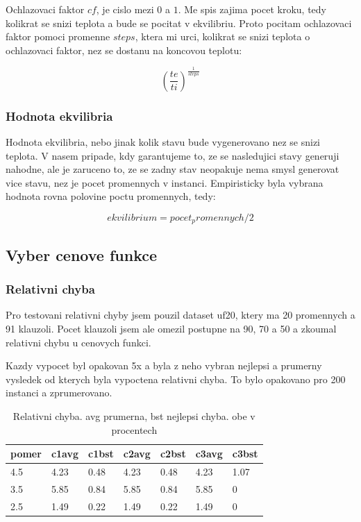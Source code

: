 \documentclass[12pt,a4paper]{article}
\begin{document}
Ochlazovaci faktor $cf$, je cislo mezi $0$ a $1$. Me spis zajima pocet kroku, tedy kolikrat se snizi teplota a bude se pocitat v ekvilibriu. Proto pocitam ochlazovaci faktor pomoci promenne $steps$, ktera mi urci, kolikrat se snizi teplota o ochlazovaci faktor, nez se dostanu na koncovou teplotu:

$$ \left(\frac{te}{ti}\right)^\frac{1}{steps} $$

\subsubsection{Hodnota ekvilibria}

Hodnota ekvilibria, nebo jinak kolik stavu bude vygenerovano nez se snizi teplota. V nasem pripade, kdy garantujeme to, ze se nasledujici stavy generuji nahodne, ale je zaruceno to, ze se zadny stav neopakuje nema smysl generovat vice stavu, nez je pocet promennych v instanci. Empiristicky byla vybrana hodnota rovna polovine poctu promennych, tedy:

$$ ekvilibrium = pocet_promennych / 2 $$


\subsection{Vyber cenove funkce}

\subsubsection{Relativni chyba}

Pro testovani relativni chyby jsem pouzil dataset uf20, ktery ma 20 promennych a 91 klauzoli. Pocet klauzoli jsem ale omezil postupne na 90, 70 a 50 a zkoumal relativni chybu u cenovych funkci.

Kazdy vypocet byl opakovan 5x a byla z neho vybran nejlepsi a prumerny vysledek od kterych byla vypoctena relativni chyba. To bylo opakovano pro 200 instanci a zprumerovano.

\begin{table}[H]
\centering
\caption{Relativni chyba. avg prumerna, bst nejlepsi chyba. obe v procentech}
\label{wat}
\begin{tabular}{|l|l|l|l|l|l|l|} \hline
pomer & c1avg  & c1bst & c2avg  & c2bst & c3avg  & c3bst   \\ \hline
4.5   & 4.23 & 0.48 & 4.23 & 0.48 & 4.23 & 1.07   \\ \hline
3.5   & 5.85 & 0.84 & 5.85 & 0.84 & 5.85 & 0   \\ \hline
2.5   & 1.49 & 0.22 & 1.49 & 0.22 & 1.49 & 0   \\ \hline
\end{tabular}
\end{table}
\end{document}
